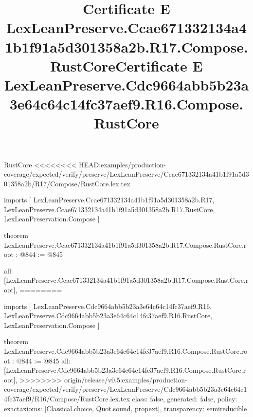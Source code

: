 \begin{lexlean}{RustCore}
<<<<<<<< HEAD:examples/production-coverage/expected/verify/preserve/LexLeanPreserve/Ccae671332134a41b1f91a5d301358a2b/R17/Compose/RustCore.lex.tex
\title{Certificate E LexLeanPreserve.Ccae671332134a41b1f91a5d301358a2b.R17.Compose.RustCore}
\begin{coremodule}
imports [
  LexLeanPreserve.Ccae671332134a41b1f91a5d301358a2b.R17,
  LexLeanPreserve.Ccae671332134a41b1f91a5d301358a2b.R17.RustCore,
  LexLeanPreservation.Compose
]

theorem LexLeanPreserve.Ccae671332134a41b1f91a5d301358a2b.R17.Compose.RustCore.root : @844 := @845 {
  all: [LexLeanPreserve.Ccae671332134a41b1f91a5d301358a2b.R17.Compose.RustCore.root],
========
\title{Certificate E LexLeanPreserve.Cdc9664abb5b23a3e64c64c14fc37aef9.R16.Compose.RustCore}
\begin{coremodule}
imports [
  LexLeanPreserve.Cdc9664abb5b23a3e64c64c14fc37aef9.R16,
  LexLeanPreserve.Cdc9664abb5b23a3e64c64c14fc37aef9.R16.RustCore,
  LexLeanPreservation.Compose
]

theorem LexLeanPreserve.Cdc9664abb5b23a3e64c64c14fc37aef9.R16.Compose.RustCore.root : @844 := @845 {
  all: [LexLeanPreserve.Cdc9664abb5b23a3e64c64c14fc37aef9.R16.Compose.RustCore.root],
>>>>>>>> origin/release/v0.5:examples/production-coverage/expected/verify/preserve/LexLeanPreserve/Cdc9664abb5b23a3e64c64c14fc37aef9/R16/Compose/RustCore.lex.tex
  class: false,
  generated: false,
  policy: exact{axioms: [Classical.choice, Quot.sound, propext]},
  transparency: semireducible
}


\end{coremodule}}
\end{coremodule}
\end{lexlean}
